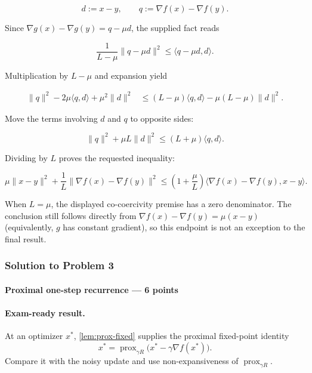 \documentclass[11pt,a4paper]{article}
\DeclareMathOperator{\prox}{prox}
\theoremstyle{definition}
\begin{document}
\[
d:=x-y,
\qquad
q:=\nabla f(x)-\nabla f(y).
\]

Since $\nabla g(x)-\nabla g(y)=q-\mu d$, the supplied fact reads

\[
\frac{1}{L-\mu}\|q-\mu d\|^2
\leq\langle q-\mu d,d\rangle.
\]

Multiplication by $L-\mu$ and expansion yield

\begin{align*}
\|q\|^2-2\mu\langle q,d\rangle+\mu^2\|d\|^2
&\leq(L-\mu)\langle q,d\rangle-\mu(L-\mu)\|d\|^2.
\end{align*}

Move the terms involving $d$ and $q$ to opposite sides:

\[
\|q\|^2+\mu L\|d\|^2
\leq(L+\mu)\langle q,d\rangle.
\]

Dividing by $L$ proves the requested inequality:

\[
\mu \|x-y\|^2+\frac{1}{L}\|\nabla f(x)-\nabla f(y)\|^2
\leq\left(1+\frac{\mu}{L}\right)
\langle\nabla f(x)-\nabla f(y),x-y\rangle.
\]

When $L=\mu$, the displayed co-coercivity premise has a zero denominator. The conclusion still follows directly from $\nabla f(x)-\nabla f(y)=\mu(x-y)$ (equivalently, $g$ has constant gradient), so this endpoint is not an exception to the final result.

\subsubsection{Solution to Problem 3}\label{sol:spr2025-opt-3}

\paragraph{Proximal one-step recurrence --- 6 points}

\paragraph{Exam-ready result.}
At an optimizer $x^*$, \cref{lem:prox-fixed} supplies the proximal fixed-point identity
\[
x^*=\prox_{\gamma R}\bigl(x^*-\gamma\nabla f(x^*)\bigr).
\]
Compare it with the noisy update and use non-expansiveness of $\prox_{\gamma R}$.
\end{document}
